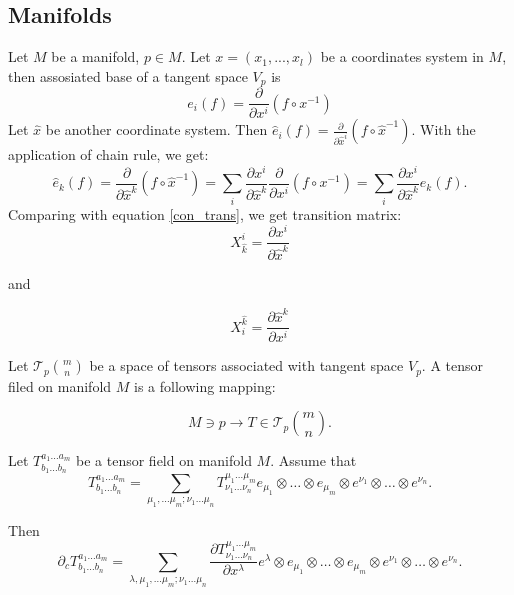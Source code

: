 \documentclass[main.tex]{subfiles}
\begin{document}
\subsection{Manifolds}

Let $M$ be a manifold, $p\in M$. Let $x = (x_1, ..., x_l)$ be a coordinates system in $M$, then assosiated base of a tangent space $V_p$ is 
\begin{equation}
\boxed{e_i(f) = \frac{\partial}{\partial x^i}(f\circ x^{-1})}
\end{equation}
Let $\hat{x}$ be another coordinate system. Then $\hat{e}_i(f) = \frac{\partial}{\partial \hat{x}^i}(f\circ \hat{x}^{-1})$. With the application of chain rule, we get:
\begin{equation}
\hat{e}_k(f) = \frac{\partial}{\partial \hat{x}^k}(f\circ \hat{x}^{-1}) = \sum_i \frac{\partial x^i}{\partial \hat{x}^k}\frac{\partial}{\partial x^i}(f\circ x^{-1}) = \sum_i \frac{\partial x^i}{\partial \hat{x}^k} e_k(f).
\end{equation}
Comparing with equation \ref{con_trans}, we get transition matrix:
\begin{equation}
\boxed{X^i_{\hat{k}} = \frac{\partial x^i}{\partial \hat{x}^k}}
\end{equation}

and

\begin{equation}
\boxed{X^{\hat{k}}_i = \frac{\partial \hat{x}^k}{\partial x^i}}
\end{equation}

Let  $\mathcal{T}_p\binom{m}{n}$ be a space of tensors associated with tangent space $V_p$. A tensor filed on manifold $M$ is a following mapping:

\begin{equation}
M \ni p \to T \in \mathcal{T}_p\binom{m}{n}.
\end{equation}

Let $T^{a_1\dots a_m}_{b_1\dots b_n}$ be a tensor field on manifold $M$. Assume that
\begin{equation}
T^{a_1\dots a_m}_{b_1\dots b_n} = \sum\limits_{\mu_1,\dots\mu_m;\nu_1\dots\mu_n} T^{\mu_1\dots\mu_m}_{\nu_1\dots\nu_n} e_{\mu_1} \otimes \dots \otimes e_{\mu_m} \otimes e^{\nu_1} \otimes \dots \otimes e^{\nu_n}.
\end{equation}

Then 
\begin{equation}
\partial_c T^{a_1\dots a_m}_{b_1\dots b_n} = \sum\limits_{\lambda, \mu_1,\dots\mu_m;\nu_1\dots\mu_n}\frac{\partial T^{\mu_1\dots\mu_m}_{\nu_1\dots\nu_n}}{\partial x^\lambda} e^\lambda \otimes e_{\mu_1} \otimes \dots \otimes e_{\mu_m} \otimes e^{\nu_1} \otimes \dots \otimes e^{\nu_n}.
\end{equation}
\end{document}
